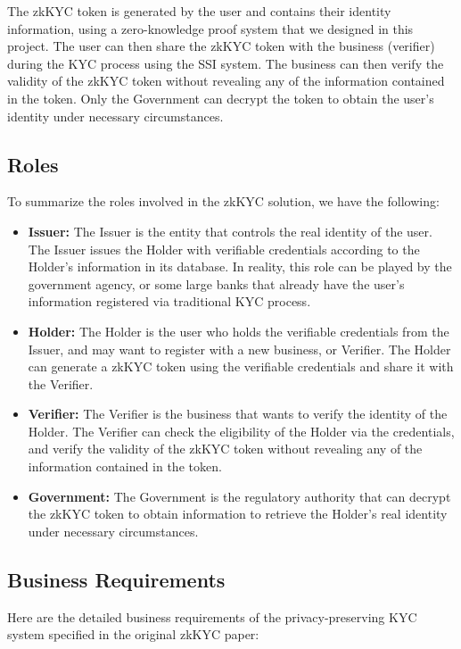 \documentclass[
]{report}
\providecommand{\tightlist}{%
  \setlength{\itemsep}{0pt}\setlength{\parskip}{0pt}}
\begin{document}
The zkKYC token is generated by the user and contains their identity
information, using a zero-knowledge proof system that we designed in
this project. The user can then share the zkKYC token with the business
(verifier) during the KYC process using the SSI system. The business can
then verify the validity of the zkKYC token without revealing any of the
information contained in the token. Only the Government can decrypt the
token to obtain the user's identity under necessary circumstances.

\subsection{Roles}
To summarize the roles involved in the zkKYC solution, we have the
following:
\begin{itemize}
\tightlist
\item
\textbf{Issuer:} The Issuer is the entity that controls the real
identity of the user. The Issuer issues the Holder with verifiable 
credentials according to the Holder's information in its database.
In reality, this role can be played by the government agency, or some
large banks that already have the user's information registered via
traditional KYC process.

\item
\textbf{Holder:} The Holder is the user who holds the verifiable
credentials from the Issuer, and may want to register with a new
business, or Verifier. The Holder can generate a zkKYC token using the
verifiable credentials and share it with the Verifier.

\item
\textbf{Verifier:} The Verifier is the business that wants to verify
the identity of the Holder. The Verifier can check the eligibility
of the Holder via the credentials, and verify the validity of the
zkKYC token without revealing any of the information contained in the
token.

\item
\textbf{Government:} The Government is the regulatory authority that
can decrypt the zkKYC token to obtain information to retrieve the
Holder's real identity under necessary circumstances.
\end{itemize}

\subsection{Business Requirements}

Here are the detailed business requirements of the privacy-preserving KYC
system specified in the original zkKYC paper:
\end{document}
